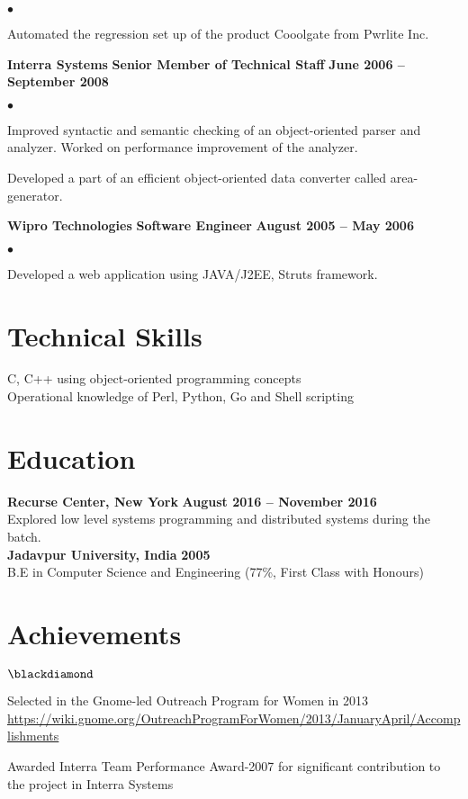 \documentclass[margin,line]{res}
\newenvironment{list1}{
  \begin{list}{$\bullet$}{%
      \setlength{\itemsep}{0in}
      \setlength{\parsep}{0in} \setlength{\parskip}{0in}
      \setlength{\topsep}{0in} \setlength{\partopsep}{0in}
      \setlength{\leftmargin}{0.17in}}}{\end{list}}
\newenvironment{list2}{
  \begin{list}{$\blackdiamond$}{%
      \setlength{\itemsep}{0in}
      \setlength{\parsep}{0in} \setlength{\parskip}{0in}
      \setlength{\topsep}{0in} \setlength{\partopsep}{0in}
      \setlength{\leftmargin}{0.2in}}}{\end{list}}
\begin{document}
\begin{resume}
\begin{list1}
\item Automated the regression set up of the product Cooolgate from Pwrlite Inc.
\end{list1}
{\bf   Interra Systems}
\hfill {\bf Senior Member of Technical Staff}
\hfill{\bf June 2006 -- September 2008}
\vspace{.05in}
\begin{list1} %
\item Improved syntactic and semantic checking of an object-oriented parser and analyzer. Worked on performance improvement of the analyzer.
\item Developed a part of an efficient object-oriented data converter called area-generator.
\end{list1}
{\bf   Wipro Technologies}
\hfill {\bf Software Engineer}
\hfill{\bf August 2005 -- May 2006}
\vspace{.05in}
\begin{list1} %
\item Developed a web application using JAVA/J2EE, Struts framework.\\
\end{list1}

\section{\sc Technical Skills}
C, C++ using object-oriented programming concepts\\
Operational knowledge of Perl, Python, Go and Shell scripting\\

\section{\sc Education}
{\bf Recurse Center, New York} \hfill {\bf August 2016 -- November 2016}\\
Explored low level systems programming and distributed systems during the batch.\\
{\bf Jadavpur University, India} \hfill {\bf 2005}\\
B.E in Computer Science and Engineering \hfill(77\%, First Class with Honours)\\

\section{\sc Achievements}
\begin{list2} %
\item Selected in the Gnome-led Outreach Program for Women in 2013 \url {https://wiki.gnome.org/OutreachProgramForWomen/2013/JanuaryApril/Accomplishments}
\item Awarded Interra Team Performance Award-2007 for significant contribution to the project in Interra Systems\\
\end{list2}

\end{resume}
\end{document}

